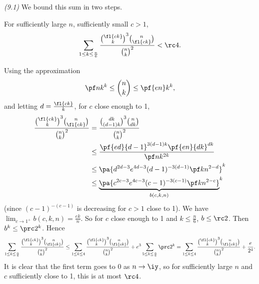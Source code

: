 \begin{problem}{\it(9.1)}
We bound this sum in two steps.
\begin{st}
For sufficiently large $n$, sufficiently small $c>1$,
\[
\sum_{1\le k\le\frac n{6}}\frac{\binom{\fl{ck}}{k}^3\binom{n}{\fl{ck}}}{\binom nk^2}< \rc 4.
\]
\end{st}
Using the approximation
\[
\pf nk^k\le \binom nk\le \pf {en}k^k,
\]
and letting $d=\frac{\fl{ck}}k$, for $c$ close enough to 1,
\begin{align*}
\frac{\binom{\fl{ck}}{k}^3\binom{n}{\fl{ck}}}{\binom nk^2}
&=\frac{\binom{dk}{(d-1)k}^3\binom{n}{dk}}{\binom nk^2}\\
&\le \frac{\pf{ed}{d-1}^{3(d-1)k}\pf{en}{dk}^{dk}}{\pf nk^{2k}}\\
&\le \pa{d^{2d-3} e^{4d-3} (d-1)^{-3(d-1)} \pf kn^{2-d}}^k\\
&\le{\underbrace{\pa{c^{2c-3} e^{4c-3} (c-1)^{-3(c-1)} \pf kn^{2-c}}}_{b(c,k,n)} }^k
\end{align*}
(since $(c-1)^{-(c-1)}$ is decreasing for $c>1$ close to 1). We have $\lim_{c\to 1^+} b(c,k,n)=\frac{ek}{n}$. 
So for $c$ close enough to 1 and $k\le \frac n{6}$, $b\le \rc2$. 
Then $b^k\le \prc 2^k$. Hence
\[
\sum_{1\le k\le \frac n{6}} \frac{\binom{\fl{ck}}{k}^3\binom{n}{\fl{ck}}}{\binom nk^2}
\le \sum_{1\le k\le 4}\frac{\binom{\fl{ck}}{k}^3\binom{n}{\fl{ck}}}{\binom nk^2}+e^3\sum_{5\le k\le \frac n6} \prc 2^k
=\sum_{1\le k\le 4}\frac{\binom{\fl{ck}}{k}^3\binom{n}{\fl{ck}}}{\binom nk^2}+\frac{e}{2^4}.
\]
It is clear that the first term goes to 0 as $n\to \iy$, so for sufficiently large $n$ and $c$ sufficiently close to 1, this is at most $\rc 4$. %


\end{problem}
